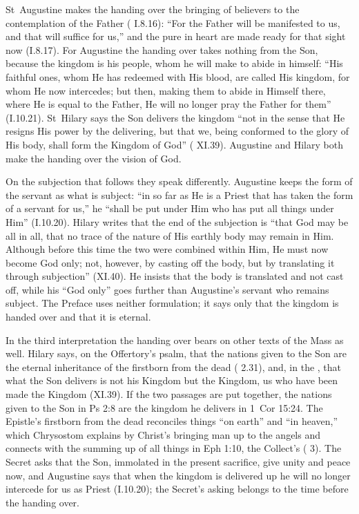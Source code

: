 St~Augustine makes the handing over the bringing of believers to the
contemplation of the Father ( I.8.16):
``For the Father will be manifested to us, and that will suffice for us,'' and
the pure in heart are made ready for that sight now (I.8.17). For
Augustine the handing over takes nothing from the Son, because the kingdom is
his people, whom he will make to abide in himself: ``His faithful ones, whom He has redeemed with
His blood, are called His kingdom, for whom He now intercedes; but then,
making them to abide in Himself there, where He is equal to the Father, He
will no longer pray the Father for them'' (I.10.21). St~Hilary says the
Son delivers the kingdom ``not in
the sense that He resigns His power by the delivering, but that we, being
conformed to the glory of His body, shall form the Kingdom of God''
( XI.39). Augustine and Hilary both make the handing over
the vision of God.

On the subjection that follows they speak differently. Augustine keeps the
form of the servant as what is subject: ``in so far as He is a Priest that has
taken the form of a servant for us,'' he ``shall be put under Him who has put
all things under Him'' (I.10.20). Hilary writes that the end of the subjection
is ``that God may be all in all, that no trace of the nature of His earthly
body may remain in Him. Although before this time the two were combined within
Him, He must now become God only; not, however, by casting off the body, but
by translating it through subjection'' (XI.40). He insists that the body is
translated and not cast off, while his ``God only'' goes further than
Augustine's servant who remains subject. The Preface uses neither
formulation; it says only that the kingdom is handed over and that it is
eternal.

In the third interpretation the handing over bears on other texts of the Mass
as well. Hilary says, on the Offertory's psalm, that the nations given to the Son are the eternal
inheritance of the firstborn from the dead (
2.31), and, in the , that what the Son delivers is not his Kingdom but the Kingdom, us who have
been made the Kingdom (XI.39). If the two passages are put
together, the nations given to the Son in Ps 2:8 are the kingdom he delivers in
1~Cor 15:24. The Epistle's firstborn from the dead reconciles things ``on earth''
and ``in heaven,'' which Chrysostom explains by Christ's bringing man up to
the angels and connects with the summing up of all things in Eph 1:10, the
Collect's  ( 3). The Secret asks
that the Son, immolated in the present sacrifice, give unity and peace now, and
Augustine says that when the kingdom is delivered up he will no longer
intercede for us as Priest (I.10.20); the Secret's asking belongs to the time
before the handing over.

